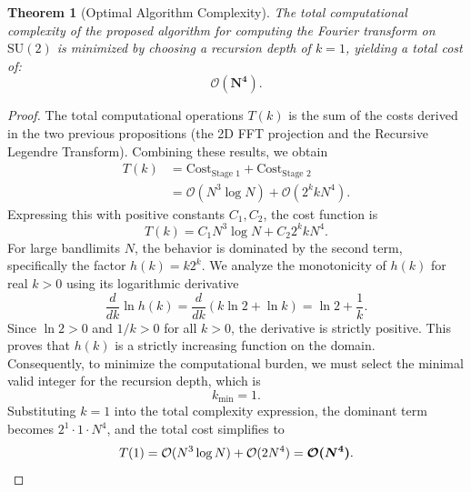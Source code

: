 \documentclass[11pt]{article}
\newtheorem{thm}{Theorem}[section]
\theoremstyle{definition}
\theoremstyle{remark}
\numberwithin{equation}{section}
\begin{document}
\begin{thm}[Optimal Algorithm Complexity]\label{TEO_FIN}
The total computational complexity of the proposed algorithm for computing the Fourier transform on $\mathrm{SU}(2)$ is minimized by choosing a recursion depth of $k=1$, yielding a total cost of:
\begin{equation*}
    \boldsymbol{\mathcal{O}(N^4)}.
\end{equation*}
\end{thm}

\begin{proof}
The total computational operations $T(k)$ is the sum of the costs derived in the two previous propositions (the 2D FFT projection and the Recursive Legendre Transform). Combining these results, we obtain
\begin{align*}
    T(k) &= \text{Cost}_{\text{Stage 1}} + \text{Cost}_{\text{Stage 2}} \\
         &= \mathcal{O}(N^3 \log N) + \mathcal{O}(2^k k N^4).
\end{align*}
Expressing this with positive constants $C_1, C_2$, the cost function is
\begin{equation*}
    T(k) = C_1 N^3 \log N + C_2 2^k k N^4.
\end{equation*}
For large bandlimits $N$, the behavior is dominated by the second term, specifically the factor $h(k) = k 2^k$. We analyze the monotonicity of $h(k)$ for real $k > 0$ using its logarithmic derivative
\begin{equation*}
    \frac{d}{dk} \ln h(k) = \frac{d}{dk} (k \ln 2 + \ln k) = \ln 2 + \frac{1}{k}.
\end{equation*}
Since $\ln 2 > 0$ and $1/k > 0$ for all $k > 0$, the derivative is strictly positive. This proves that $h(k)$ is a strictly increasing function on the domain.\\%

Consequently, to minimize the computational burden, we must select the minimal valid integer for the recursion depth, which is
\begin{equation*}
    k_{\min} = 1.
\end{equation*}
Substituting $k=1$ into the total complexity expression, the dominant term becomes $2^1 \cdot 1 \cdot N^4$, and the total cost simplifies to
\begin{equation*}
    T(1) = \mathcal{O}(N^3 \log N) + \mathcal{O}(2 N^4) = \boldsymbol{\mathcal{O}(N^4)}. \qedhere
\end{equation*}
\end{proof}
\end{document}
